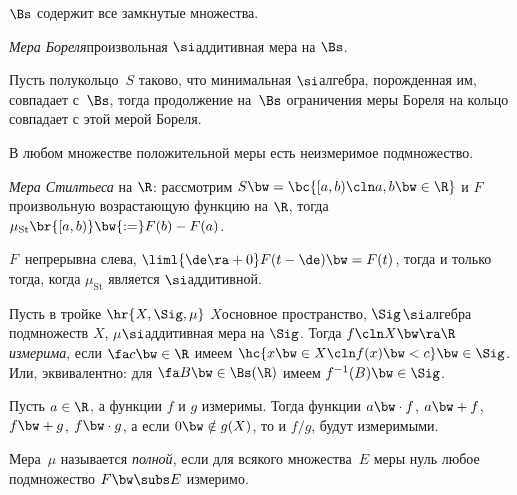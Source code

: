 \documentclass[a4paper]{article}
\begin{document}
\begin{imp}
  $\Bs$ содержит все замкнутые множества.
\end{imp}

\begin{df}
  \emph{Мера Бореля}\т произвольная $\si$\д аддитивная мера на $\Bs$.
\end{df}

\begin{theorem}
  Пусть полукольцо~$S$ таково,
  что минимальная $\si$\д алгебра, порожденная им, совпадает с~$\Bs$, тогда
  продолжение на~$\Bs$ ограничения меры Бореля на кольцо совпадает с этой мерой Бореля.
\end{theorem}

\begin{stm}
  В любом множестве положительной меры есть неизмеримое подмножество.
\end{stm}

\begin{df}
  \emph{Мера Стилтьеса} на $\R$: рассмотрим $S \bw= \bc{[a,b)\cln a,b \bw\in \R}$ и $F$\т
  произвольную возрастающую функцию на $\R$,
  тогда $\mu_\mathrm{St} \br{[a,b)} \bw{:=} F(b)-F(a)$.
\end{df}

\begin{theorem}
  $F$~непрерывна слева,  $\liml{\de\ra+0} F(t-\de) \bw= F(t)$, тогда и только тогда,
  когда $\mu_\mathrm{St}$ является $\si$\д аддитивной.
\end{theorem}

\begin{df}
  Пусть в тройке $\hr{X,\Sig,\mu}$ $X$\т основное пространство, $\Sig$\т $\si$\д алгебра
  подмножеств $X$, $\mu$\т $\si$\д аддитивная мера на $\Sig$. Тогда $f\cln X \bw\ra \R$
  \emph{измерима}, если $\fa c \bw\in\R$ имеем $\hc{x \bw\in X\cln f(x)\bw< c} \bw\in \Sig$.
  Или, эквивалентно: для $\fa B \bw\in \Bs(\R)$ имеем $f^{-1}(B) \bw\in \Sig$.
\end{df}

\begin{stm}
  Пусть $a \in \R$, а функции $f$ и $g$ измеримы. Тогда функции $a \bw\cdot f$, $a \bw+ f$,
  $f \bw+ g$, $f \bw\cdot g$, а если $0 \bw\notin g(X)$, то и $f/g$, будут измеримыми.
\end{stm}

\begin{df}
  Мера~$\mu$ называется \emph{полной}, если для всякого множества~$E$ меры нуль любое
  подмножество $F \bw\subs E$ измеримо.
\end{df}
\end{document}
